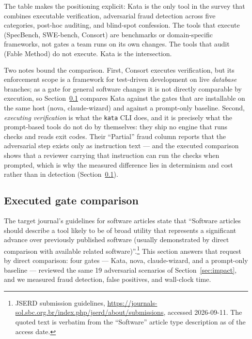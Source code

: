\documentclass[11pt]{article}
\begin{document}
The table makes the positioning explicit: Kata is the only tool in the
survey that combines executable verification, adversarial fraud detection
across five categories, post-hoc auditing, and blind-spot confession.
The tools that execute (SpecBench, SWE-bench, Consort) are benchmarks or
domain-specific frameworks, not gates a team runs on its own changes. The
tools that audit (Fable Method) do not execute. Kata is the intersection.

Two notes bound the comparison. First, Consort \cite{consort} executes
verification, but its enforcement scope is a framework for test-driven
development on live \emph{database} branches; as a gate for general software
changes it is not directly comparable by execution, so Section~\ref{sec:exec-comparison}
compares Kata against the gates that are installable on the same host
(nova, claude-wizard) and against a prompt-only baseline. Second,
\emph{executing verification} is what the \texttt{kata} CLI does, and it is
precisely what the prompt-based tools do not do by themselves: they ship no
engine that runs checks and reads exit codes. Their ``Partial'' fraud column
reports that the adversarial step exists only as instruction text --- and
the executed comparison shows that a reviewer carrying that instruction can
run the checks when prompted, which is why the measured difference lies in
determinism and cost rather than in detection
(Section~\ref{sec:exec-comparison}).

\subsection{Executed gate comparison}
\label{sec:exec-comparison}

The target journal's guidelines for software articles state that ``Software articles
should describe a tool likely to be of broad utility that represents a
significant advance over previously published software (usually demonstrated
by direct comparison with available related software)''.\footnote{JSERD
submission guidelines,
\url{https://journals-sol.sbc.org.br/index.php/jserd/about/submissions},
accessed 2026-09-11. The quoted text is verbatim from the ``Software''
article type description as of the access date.} This
section answers that request by direct comparison: four gates --- Kata, nova, claude-wizard,
and a prompt-only baseline --- reviewed the same 19 adversarial scenarios of
Section~\ref{sec:impact}, and we measured fraud detection, false positives,
and wall-clock time.
\end{document}

